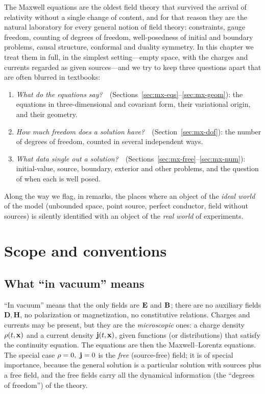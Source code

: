 The Maxwell equations are the oldest field theory that survived the
arrival of relativity without a single change of content, and for that
reason they are the natural laboratory for every general notion of field
theory: constraints, gauge freedom, counting of degrees of freedom,
well-posedness of initial and boundary problems, causal structure,
conformal and duality symmetry.  In this chapter we treat them in full,
in the simplest setting---empty space, with the charges and currents
regarded as given sources---and we try to keep three questions apart
that are often blurred in textbooks:
\begin{enumerate}
\item \emph{What do the equations say?}\ \ (Sections~\ref{sec:mx-eqs}--\ref{sec:mx-geom}):
  the equations in three-dimensional and covariant form, their
  variational origin, and their geometry.
\item \emph{How much freedom does a solution have?}\ \ (Section~\ref{sec:mx-dof}):
  the number of degrees of freedom, counted in several independent ways.
\item \emph{What data single out a solution?}\ \ (Sections~\ref{sec:mx-free}--\ref{sec:mx-num}):
  initial-value, source, boundary, exterior and other problems, and the
  question of when each is well posed.
\end{enumerate}
Along the way we flag, in remarks, the places where an object of the
\emph{ideal world} of the model (unbounded space, point source, perfect
conductor, field without sources) is silently identified with
an object of the \emph{real world} of experiments.

\section{Scope and conventions}\label{sec:mx-conv}

\subsection{What ``in vacuum'' means}

``In vacuum'' means that the only fields are $\mathbf{E}$ and $\mathbf{B}$; there are no
auxiliary fields $\mathbf D,\mathbf H$, no polarization or magnetization,
no constitutive relations.  Charges and currents may be present, but they
are the \emph{microscopic} ones: a charge density $\rho(t,\mathbf{x})$ and a
current density $\mathbf{j}(t,\mathbf{x})$, given functions (or distributions) that
satisfy the continuity equation.  The equations are then the
Maxwell--Lorentz equations.  The special case $\rho=0,\ \mathbf{j}=0$ is the
\emph{free} (source-free) field; it is of special importance, because the
general solution is a particular solution with sources plus a free
field, and the free fields carry all the dynamical information (the
``degrees of freedom'') of the theory.

